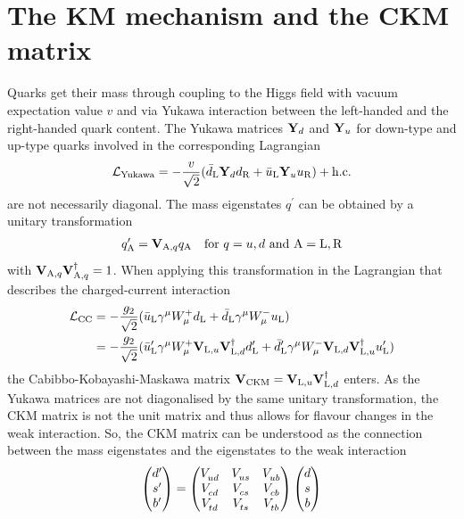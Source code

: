 
\section{The KM mechanism and the CKM matrix}
\label{sec:cpviolation:kmmechanism}

Quarks get their mass through coupling to the Higgs field with vacuum
expectation value $v$ and via Yukawa interaction between the left-handed and
the right-handed quark content. The Yukawa matrices $\mathbf{Y}_d$ and
$\mathbf{Y}_u$ for down-type and up-type quarks involved in the corresponding
Lagrangian
\begin{align}
	\mathcal{L}_{\textrm{Yukawa}} = - \frac{v}{\sqrt{2}} (\bar{d}_{\mathrm{L}} \mathbf{Y}_d d_{\mathrm{R}} + \bar{u}_{\mathrm{L}} \mathbf{Y}_u u_{\mathrm{R}}) + \text{h.c.}
\end{align}
are not necessarily diagonal. The mass eigenstates $q^{\prime}$ can be
obtained by a unitary transformation
\begin{align}
	q^{\prime}_{\mathrm{A}} = \mathbf{V}_{\mathrm{A,}q}q_{\mathrm{A}} \quad \text{for } q = u,d \text{ and } \mathrm{A} = \mathrm{L,R}
\end{align}
with $\mathbf{V}_{\mathrm{A,}q}\mathbf{V}^\dagger_{\mathrm{A,}q} = 1$. When
applying this transformation in the Lagrangian that describes the
charged-current interaction
\begin{align}
	\mathcal{L}_{\textrm{CC}} &= -\frac{g_2}{\sqrt{2}}(\bar{u}_{\mathrm{L}}\gamma^{\mu}W_{\mu}^+ d_{\mathrm{L}} + \bar{d}_{\mathrm{L}}\gamma^{\mu}W_{\mu}^-u_{\mathrm{L}})\\
	&= -\frac{g_2}{\sqrt{2}}(\bar{u}^\prime_{\mathrm{L}}\gamma^{\mu}W_{\mu}^+\mathbf{V}_{\mathrm{L,}u}\mathbf{V}^\dagger_{\mathrm{L,}d}d^\prime_{\mathrm{L}} + \bar{d}^\prime_{\mathrm{L}}\gamma^{\mu}W_{\mu}^-\mathbf{V}_{\mathrm{L,}d}\mathbf{V}^\dagger_{\mathrm{L,}u}u^\prime_{\mathrm{L}})
\end{align}
the Cabibbo-Kobayashi-Maskawa matrix $\mathbf{V}_{\text{CKM}} =
\mathbf{V}_{\mathrm{L,}u}\mathbf{V}^\dagger_{\mathrm{L,}d}$ enters. As the
Yukawa matrices are not diagonalised by the same unitary transformation, the
CKM matrix is not the unit matrix and thus allows for flavour changes in the
weak interaction. So, the CKM matrix can be understood as the connection
between the mass eigenstates and the eigenstates to the weak interaction
\begin{align}
\begin{pmatrix}
d^\prime \\ s^\prime \\ b^\prime
\end{pmatrix}
=
\begin{pmatrix}
{\ensuremath{V_{{u}{d}}^{}}} & {V_{{u}{s}}^{}} & {V_{{u}{b}}^{}} \\
{V_{{c}{d}}^{}} & {V_{{c}{s}}^{}} & {V_{{c}{b}}^{}} \\
{V_{{t}{d}}^{}} & {V_{{t}{s}}^{}} & {V_{{t}{b}}^{}} \\
\end{pmatrix}
\begin{pmatrix}
d	\\	s	\\	b
\end{pmatrix}
\end{align}

